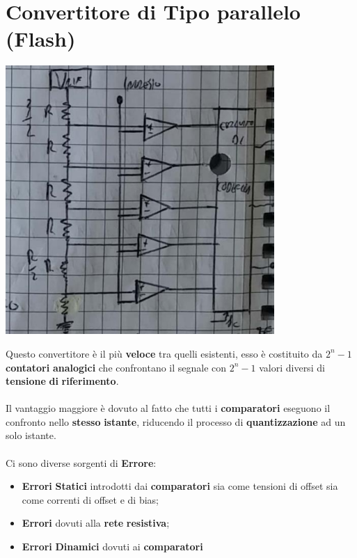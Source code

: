 \section{Convertitore di Tipo parallelo (Flash)}
\begin{center}
    \includegraphics[width=.5\textwidth]{Images/figure45.png}
\end{center}
Questo convertitore è il più \textbf{veloce} tra quelli esistenti, esso è costituito da $2^n - 1$ \textbf{contatori} \textbf{analogici} che confrontano il segnale con $2^n -1$ valori diversi di \textbf{tensione} \textbf{di} \textbf{riferimento}.\\ \\
Il vantaggio maggiore è dovuto al fatto che tutti i \textbf{comparatori} eseguono il confronto nello \textbf{stesso} \textbf{istante}, riducendo il processo di \textbf{quantizzazione} ad un solo istante.\\ \\
Ci sono diverse sorgenti di \textbf{Errore}:
\begin{itemize}
    \item \textbf{Errori} \textbf{Statici} introdotti dai \textbf{comparatori} sia come tensioni di offset sia come correnti di offset e di bias;
    \item \textbf{Errori} dovuti alla \textbf{rete} \textbf{resistiva};
    \item \textbf{Errori} \textbf{Dinamici} dovuti ai \textbf{comparatori}
\end{itemize}

